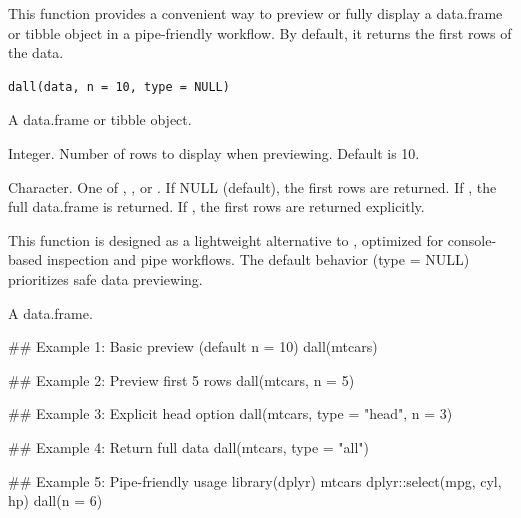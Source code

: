 \documentclass[a4paper]{book}
\begin{document}
%
\begin{Description}
This function provides a convenient way to preview or fully display
a data.frame or tibble object in a pipe-friendly workflow.
By default, it returns the first  rows of the data.
\end{Description}
%
\begin{Usage}
\begin{verbatim}
dall(data, n = 10, type = NULL)
\end{verbatim}
\end{Usage}
%
\begin{Arguments}
\begin{ldescription}
\item[\code{data}] A data.frame or tibble object.

\item[\code{n}] Integer. Number of rows to display when previewing. Default is 10.

\item[\code{type}] Character. One of , , or .
If NULL (default), the first  rows are returned.
If , the full data.frame is returned.
If , the first  rows are returned explicitly.
\end{ldescription}
\end{Arguments}
%
\begin{Details}
This function is designed as a lightweight alternative to ,
optimized for console-based inspection and pipe  workflows.
The default behavior (type = NULL) prioritizes safe data previewing.
\end{Details}
%
\begin{Value}
A data.frame.
\end{Value}
%
\begin{Examples}
\begin{ExampleCode}
## Example 1: Basic preview (default n = 10)
dall(mtcars)

## Example 2: Preview first 5 rows
dall(mtcars, n = 5)

## Example 3: Explicit head option
dall(mtcars, type = "head", n = 3)

## Example 4: Return full data
dall(mtcars, type = "all")

## Example 5: Pipe-friendly usage
library(dplyr)
mtcars %
  dplyr::select(mpg, cyl, hp) %
  dall(n = 6)

\end{ExampleCode}
\end{Examples}
\end{document}
